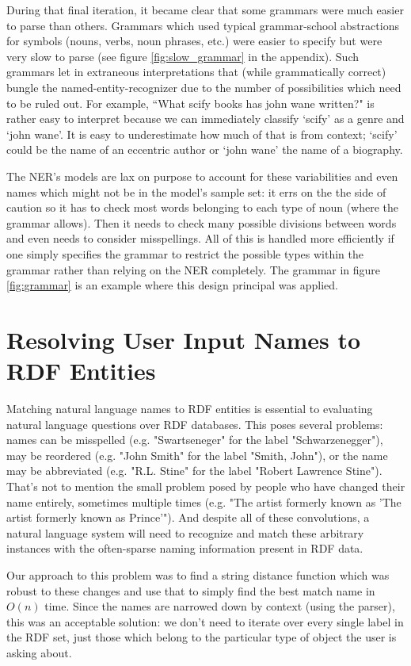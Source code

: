 \documentclass[11pt]{article}
\begin{document}
During that final iteration, it became clear that some grammars were much
easier to parse than others. Grammars which used typical grammar-school abstractions
for symbols (nouns, verbs, noun phrases, etc.) were easier to specify but were very
slow to parse (see figure \ref{fig:slow_grammar} in the appendix). Such grammars let in 
extraneous interpretations that (while grammatically
correct) bungle the named-entity-recognizer due to the number of possibilities which
need to be ruled out. For example, ``What scify books has john wane written?" is rather
easy to interpret because we can immediately classify `scify' as a genre and `john wane'.
It is easy to underestimate how much of that is from context; `scify' could be the
name of an eccentric author or `john wane' the name of a biography.

The NER's models are lax on purpose to account for these variabilities and
even names which might not be in the model's sample set: it errs
on the the side of caution so it has to check most words belonging to each type
of noun (where the grammar allows). Then it needs to check many possible divisions
between words and even needs to consider misspellings. All of this is handled more 
efficiently if one simply specifies the grammar to restrict the possible types 
within the grammar rather than relying on the NER completely. The grammar
in figure \ref{fig:grammar} is an example where this design principal was applied.


\section{Resolving User Input Names to RDF Entities}

Matching natural language names to RDF entities is essential to evaluating
natural language questions over RDF databases. This poses several problems:
names can be misspelled (e.g. "Swartseneger" for the label "Schwarzenegger"), 
may be reordered (e.g. "John Smith" for the label "Smith, John"),
or the name may be abbreviated (e.g. "R.L. Stine" for the label "Robert Lawrence Stine").
That's not to mention the small problem posed by people who have
changed their name entirely, sometimes multiple times
(e.g. "The artist formerly known as 'The artist formerly known as Prince'").
And despite all of these convolutions, a natural language system will need to
recognize and match these arbitrary instances with the often-sparse naming information
present in RDF data.

Our approach to this problem was to find a string distance function which was
robust to these changes and use that to simply
find the best match name in $O(n)$ time. Since the names are narrowed down by
context (using the parser), this was an acceptable solution: we don't need to iterate
over every single label in the RDF set, just those which belong to the particular
type of object the user is asking about.
\end{document}
